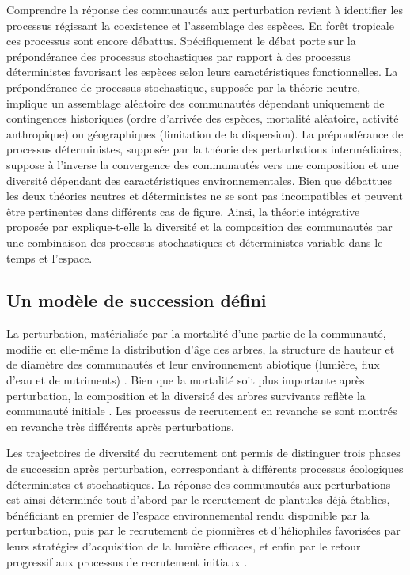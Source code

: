 \documentclass[
  11pt,
  french,
  A4paper,
  extrafontsizes,onecolumn,openright
  ]{memoir}
\begin{document}
Comprendre la réponse des communautés aux perturbation revient à
identifier les processus régissant la coexistence et l'assemblage des
espèces. En forêt tropicale ces processus sont encore débattus.
Spécifiquement le débat porte sur la prépondérance des processus
stochastiques par rapport à des processus déterministes favorisant les
espèces selon leurs caractéristiques fonctionnelles. La prépondérance de
processus stochastique, supposée par la théorie neutre, implique un
assemblage aléatoire des communautés dépendant uniquement de
contingences historiques (ordre d'arrivée des espèces, mortalité
aléatoire, activité anthropique) ou géographiques (limitation de la
dispersion). La prépondérance de processus déterministes, supposée par
la théorie des perturbations intermédiaires, suppose à l'inverse la
convergence des communautés vers une composition et une diversité
dépendant des caractéristiques environnementales. Bien que débattues les
deux théories neutres et déterministes ne se sont pas incompatibles et
peuvent être pertinentes dans différents cas de figure. Ainsi, la
théorie intégrative proposée par \textcite{Chave2004} explique-t-elle la
diversité et la composition des communautés par une combinaison des
processus stochastiques et déterministes variable dans le temps et
l'espace.

\subsection{Un modèle de succession
défini}\label{un-modele-de-succession-defini}

La perturbation, matérialisée par la mortalité d'une partie de la
communauté, modifie en elle-même la distribution d'âge des arbres, la
structure de hauteur et de diamètre des communautés et leur
environnement abiotique (lumière, flux d'eau et de nutriments)
\autocites{Gourlet-Fleury2000}{Putz2012}{Piponiot2016}{Rutishauser2016}.
Bien que la mortalité soit plus importante après perturbation, la
composition et la diversité des arbres survivants reflète la communauté
initiale \autocite{Herault2018}. Les processus de recrutement en
revanche se sont montrés en revanche très différents après
perturbations.

Les trajectoires de diversité du recrutement ont permis de distinguer
trois phases de succession après perturbation, correspondant à
différents processus écologiques déterministes et stochastiques. La
réponse des communautés aux perturbations est ainsi déterminée tout
d'abord par le recrutement de plantules déjà établies, bénéficiant en
premier de l'espace environnemental rendu disponible par la
perturbation, puis par le recrutement de pionnières et d'héliophiles
favorisées par leurs stratégies d'acquisition de la lumière efficaces,
et enfin par le retour progressif aux processus de recrutement initiaux
\autocites{Denslow2000}{Herault2010}{Herault2011}.
\end{document}
